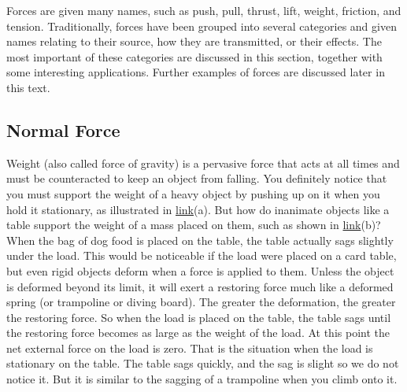 \documentclass[
]{book}
\begin{document}
Forces are given many names, such as push, pull, thrust, lift, weight,
friction, and tension. Traditionally, forces have been grouped into
several categories and given names relating to their source, how they
are transmitted, or their effects. The most important of these
categories are discussed in this section, together with some interesting
applications. Further examples of forces are discussed later in this
text.

\hypertarget{fs-id2422399}{}
\hypertarget{normal-force}{%
\subsection{Normal Force}\label{normal-force}}

\protect\hypertarget{import-auto-id1910210}{}{Weight} (also called force of
gravity) is a pervasive force that acts at all times and must be
counteracted to keep an object from falling. You definitely notice that
you must support the weight of a heavy object by pushing up on it when
you hold it stationary, as illustrated in
\protect\hyperlink{import-auto-id2672874}{link}(a). But how do
inanimate objects like a table support the weight of a mass placed on
them, such as shown in
\protect\hyperlink{import-auto-id2672874}{link}(b)? When the bag
of dog food is placed on the table, the table actually sags slightly
under the load. This would be noticeable if the load were placed on a
card table, but even rigid objects deform when a force is applied to
them. Unless the object is deformed beyond its limit, it will exert a
restoring force much like a deformed spring (or trampoline or diving
board). The greater the deformation, the greater the restoring force. So
when the load is placed on the table, the table sags until the restoring
force becomes as large as the weight of the load. At this point the net
external force on the load is zero. That is the situation when the load
is stationary on the table. The table sags quickly, and the sag is
slight so we do not notice it. But it is similar to the sagging of a
trampoline when you climb onto it.
\end{document}
